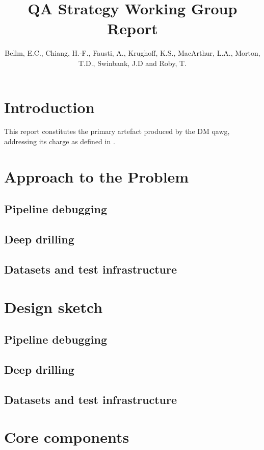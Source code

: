 \documentclass[DM,authoryear,toc,lsstdraft]{lsstdoc}
\title{QA Strategy Working Group Report}
\author{%
Bellm, E.C.,
Chiang, H.-F.,
Fausti, A.,
Krughoff, K.S.,
MacArthur, L.A.,
Morton, T.D.,
Swinbank, J.D and
Roby, T.
}
\date{\vcsDate}
\begin{document}
\maketitle

\section{Introduction}
\label{sec:intro}

This report constitutes the primary artefact produced by the DM \gls{qawg},
addressing its charge as defined in .

\section{Approach to the Problem}

\subsection{Pipeline debugging}

\subsection{Deep drilling}

\subsection{Datasets and test infrastructure}

\section{Design sketch}

\subsection{Pipeline debugging}

\subsection{Deep drilling}

\subsection{Datasets and test infrastructure}

\section{Core components}

%
\printglossary[style=index]


\end{document}
